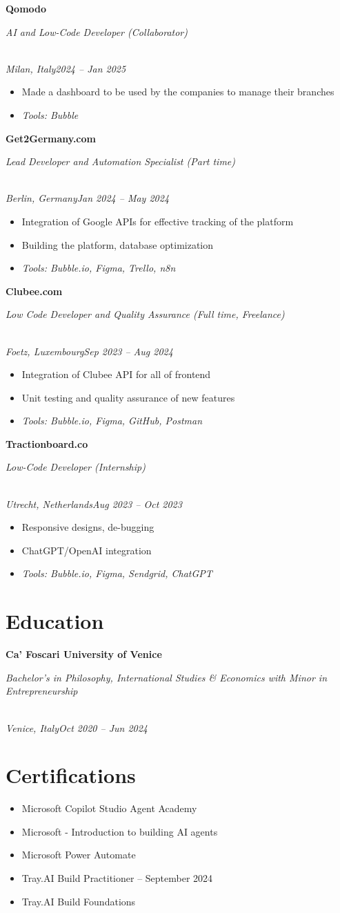 \documentclass[a4paper,10pt]{article}
\newcommand{\role}[4]{\vspace{3pt}\noindent\hspace{0.6em}\parbox[t]{0.38\textwidth}{\raggedright\textbf{#1}}\hfill\parbox[t]{0.58\textwidth}{\raggedleft\textit{#2}}\\{\textit{#3}\hfill\textit{#4}}\vspace{1pt}}
\begin{document}
\role{Qomodo}{AI and Low-Code Developer (Collaborator)}{Milan, Italy}{2024 -- Jan 2025}
\begin{itemize}
\item Made a dashboard to be used by the companies to manage their branches
\item \textit{Tools: Bubble}
\end{itemize}

\role{Get2Germany.com}{Lead Developer and Automation Specialist (Part time)}{Berlin, Germany}{Jan 2024 -- May 2024}
\begin{itemize}
\item Integration of Google APIs for effective tracking of the platform
\item Building the platform, database optimization
\item \textit{Tools: Bubble.io, Figma, Trello, n8n}
\end{itemize}

\role{Clubee.com}{Low Code Developer and Quality Assurance (Full time, Freelance)}{Foetz, Luxembourg}{Sep 2023 -- Aug 2024}
\begin{itemize}
\item Integration of Clubee API for all of frontend
\item Unit testing and quality assurance of new features
\item \textit{Tools: Bubble.io, Figma, GitHub, Postman}
\end{itemize}

\role{Tractionboard.co}{Low-Code Developer (Internship)}{Utrecht, Netherlands}{Aug 2023 -- Oct 2023}
\begin{itemize}
\item Responsive designs, de-bugging
\item ChatGPT/OpenAI integration
\item \textit{Tools: Bubble.io, Figma, Sendgrid, ChatGPT}
\end{itemize}

\section{Education}
\role{Ca' Foscari University of Venice}{Bachelor's in Philosophy, International Studies \& Economics with Minor in Entrepreneurship}{Venice, Italy}{Oct 2020 -- Jun 2024}

\section{Certifications}
\begin{itemize}
\item Microsoft Copilot Studio Agent Academy
\item Microsoft - Introduction to building AI agents
\item Microsoft Power Automate
\item Tray.AI Build Practitioner -- September 2024
\item Tray.AI Build Foundations
\end{itemize}
\end{document}
